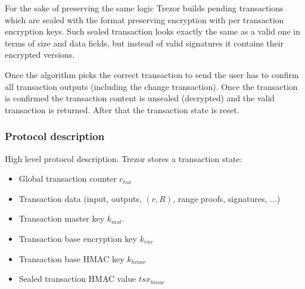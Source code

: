 \documentclass[]{article}
\begin{document}
For the sake of preserving the same logic Trezor builds pending transactions which are sealed with the format preserving encryption with per transaction encryption keys. Such sealed transaction looks exactly the same as a valid one in terms of size and data fields, but instead of valid signatures it contains their encrypted versions. 

Once the algorithm picks the correct transaction to send the user has to confirm all transaction outputs (including the change transaction). Once the transaction is confirmed the transaction content is unsealed (decrypted) and the valid transaction is returned. After that the transaction state is reset.


\subsubsection{Protocol description} High level protocol description.
Trezor stores a transaction state:
\begin{itemize}
	\item Global transaction counter $c_{tsx}$
	\item Transaction data (input, outputs, $(r,R)$, range proofs, signatures, $\dots$)
	\item Transaction master key $k_{mst}$.
	\item Transaction base encryption key $k_{enc}$
	\item Transaction base HMAC key $k_{hmac}$
	\item Sealed transaction HMAC value $tsx_{hmac}$
\end{itemize}
\end{document}
